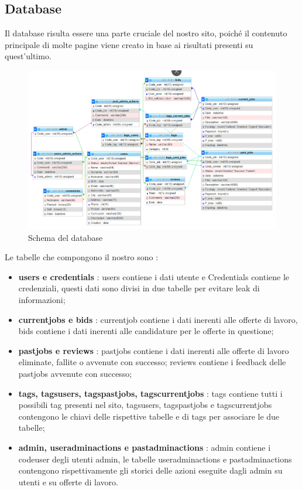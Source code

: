   \subsection{Database}
  Il database risulta essere una parte cruciale del nostro sito, poiché il contenuto principale di molte pagine viene creato in base ai risultati presenti su quest'ultimo. 
  \begin{figure}[h]
    \includegraphics[scale=0.5]{Images/DB2.png}
    \caption{Schema del database}
    \centering
  \end{figure}
  Le tabelle che compongono il nostro sono :
  \begin{itemize}
    \item \textbf{users e credentials} : users contiene i dati utente e Credentials contiene le credenziali, questi dati sono divisi in due tabelle per evitare leak di informazioni;
    \item \textbf{current\textunderscore jobs e bids} : current\textunderscore job contiene i dati inerenti alle offerte di lavoro, bids contiene i dati inerenti alle candidature per le offerte in questione;
    \item \textbf{past\textunderscore jobs e reviews} : past\textunderscore jobs contiene i dati inerenti alle offerte di lavoro eliminate, fallite o avvenute con successo; reviews contiene i feedback delle past\textunderscore jobs avvenute con successo;
    \item \textbf{tags, tags\textunderscore users, tags\textunderscore past\textunderscore jobs, tags\textunderscore current\textunderscore jobs} : tags contiene tutti i possibili tag presenti nel sito, tags\textunderscore users, tags\textunderscore past\textunderscore jobs e tags\textunderscore current\textunderscore jobs contengono le chiavi delle rispettive tabelle e di tags per associare le due tabelle;
    \item \textbf{admin, user\textunderscore admin\textunderscore actions e past\textunderscore admin\textunderscore actions} : admin contiene i code\textunderscore user degli utenti admin, le tabelle user\textunderscore admin\textunderscore actions e past\textunderscore admin\textunderscore actions contengono rispettivamente gli storici delle azioni eseguite dagli admin su utenti e su offerte di lavoro. 
  
  \end{itemize}

